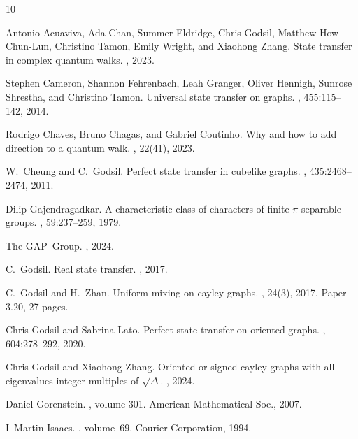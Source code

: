 \documentclass{amsart}
\theoremstyle{plain}
\theoremstyle{remark}\newtheorem{con}[theorem]{Construction}
\theoremstyle{remark} \newtheorem*{remark}{Remark}
\theoremstyle{remark} \newtheorem{example}{Example}
\begin{document}
\begin{thebibliography}{10}
	
	Antonio Acuaviva, Ada Chan, Summer Eldridge, Chris Godsil, Matthew
	How-Chun-Lun, Christino Tamon, Emily Wright, and Xiaohong Zhang.
	\newblock State transfer in complex quantum walks.
	, 2023.
	
	Stephen Cameron, Shannon Fehrenbach, Leah Granger, Oliver Hennigh, Sunrose
	Shrestha, and Christino Tamon.
	\newblock Universal state transfer on graphs.
	, 455:115--142, 2014.
	
	Rodrigo Chaves, Bruno Chagas, and Gabriel Coutinho.
	\newblock Why and how to add direction to a quantum walk.
	, 22(41), 2023.
	
	W.~Cheung and C.~Godsil.
	\newblock Perfect state transfer in cubelike graphs.
	, 435:2468--2474, 2011.
	
	Dilip Gajendragadkar.
	\newblock A characteristic class of characters of finite $\pi$-separable
	groups.
	, 59:237--259, 1979.
	
	The GAP~Group.
	,
	2024.
	
	C.~Godsil.
	\newblock Real state transfer.
	, 2017.
	
	C.~Godsil and H.~Zhan.
	\newblock Uniform mixing on cayley graphs.
	, 24(3), 2017.
	\newblock Paper 3.20, 27 pages.
	
	Chris Godsil and Sabrina Lato.
	\newblock Perfect state transfer on oriented graphs.
	, 604:278--292, 2020.
	
	Chris Godsil and Xiaohong Zhang.
	\newblock Oriented or signed cayley graphs with all eigenvalues integer
	multiples of $\sqrt{\Delta}$.
	, 2024.
	
	Daniel Gorenstein.
	, volume 301.
	\newblock American Mathematical Soc., 2007.
	
	I~Martin Isaacs.
	, volume~69.
	\newblock Courier Corporation, 1994.
	

\end{thebibliography}
\end{document}
